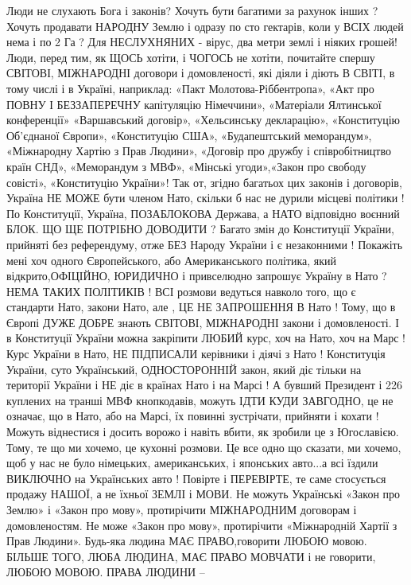 \begin{itemize}
Люди не слухають Бога і законів? Хочуть бути багатими за рахунок інших ? Хочуть
продавати НАРОДНУ Землю і одразу по сто гектарів, коли у ВСІХ людей нема і по 2
Га ? Для НЕСЛУХНЯНИХ - вірус, два метри землі і ніяких грошей! Люди, перед тим,
як ЩОСЬ хотіти, і ЧОГОСЬ не хотіти, почитайте спершу СВІТОВІ, МІЖНАРОДНІ
договори і домовленості, які діяли і діють В СВІТІ, в тому числі і в Україні,
наприклад: «Пакт Молотова-Ріббентропа», «Акт про ПОВНУ І БЕЗЗАПЕРЕЧНУ
капітуляцію Німеччини», «Матеріали Ялтинської конференції» «Варшавський
договір», «Хельсинську декларацію», «Конституцію Об’єднаної Європи»,
«Конституцію США», «Будапештський меморандум», «Міжнародну Хартію з Прав
Людини», «Договір про дружбу і співробітництво країн СНД», «Меморандум з МВФ»,
«Мінські угоди»,«Закон про свободу совісті», «Конституцію України»! Так от,
згідно багатьох цих законів і договорів, Україна НЕ МОЖЕ бути членом Нато,
скільки б нас не дурили місцеві політики ! По Конституції, Україна, ПОЗАБЛОКОВА
Держава, а НАТО відповідно воєнний БЛОК. ЩО ЩЕ ПОТРІБНО ДОВОДИТИ ? Багато змін
до Конституції України, прийняті без референдуму, отже БЕЗ Народу України і є
незаконними ! Покажіть мені хоч одного Європейського, або Американського
політика, який відкрито,ОФІЦІЙНО, ЮРИДИЧНО і привселюдно запрошує Україну в
Нато ? НЕМА ТАКИХ ПОЛІТИКІВ ! ВСІ розмови ведуться навколо того, що є стандарти
Нато, закони Нато, але , ЦЕ НЕ ЗАПРОШЕННЯ В Нато ! Тому, що в Європі ДУЖЕ ДОБРЕ
знають СВІТОВІ, МІЖНАРОДНІ закони і домовленості. І в Конституції України можна
закріпити ЛЮБИЙ курс, хоч на Нато, хоч на Марс ! Курс України в Нато, НЕ
ПІДПИСАЛИ керівники і діячі з Нато ! Конституція України, суто Український,
ОДНОСТОРОННІЙ закон, який діє тільки на території України і НЕ діє в країнах
Нато і на Марсі ! А бувший Президент і 226 куплених на транші МВФ кнопкодавів,
можуть ІДТИ КУДИ ЗАВГОДНО, це не означає, що в Нато, або на Марсі, їх повинні
зустрічати, прийняти і кохати ! Можуть віднестися і досить ворожо і навіть
вбити, як зробили це з Югославією. Тому, те що ми хочемо, це кухонні розмови.
Це все одно що сказати, ми хочемо, щоб у нас не було німецьких, американських,
і японських авто...а всі їздили ВИКЛЮЧНО на Українських авто ! Повірте і
ПЕРЕВІРТЕ, те саме стосується продажу НАШОЇ, а не їхньої ЗЕМЛІ і МОВИ. Не
можуть Українські «Закон про Землю» і «Закон про мову», протирічити МІЖНАРОДНИМ
договорам і домовленостям. Не може «Закон про мову», протирічити «Міжнародній
Хартії з Прав Людини». Будь-яка людина МАЄ ПРАВО,говорити ЛЮБОЮ мовою. БІЛЬШЕ
ТОГО, ЛЮБА ЛЮДИНА, МАЄ ПРАВО МОВЧАТИ і не говорити, ЛЮБОЮ МОВОЮ. ПРАВА ЛЮДИНИ –

\end{itemize}
